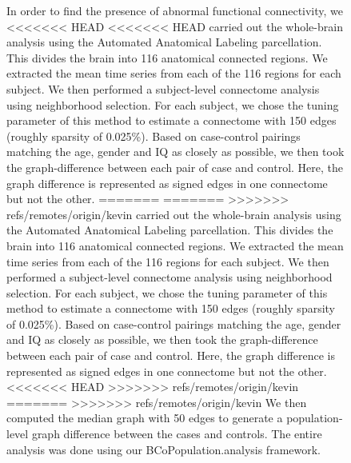 \documentclass{nature}
\begin{document}
{\begin{figure}[tb]
In order to find the presence of abnormal functional connectivity, we 
<<<<<<< HEAD
<<<<<<< HEAD
carried out the whole-brain analysis using the Automated Anatomical Labeling\cite{tzourio2002automated} parcellation. This divides the brain into
116 anatomical connected regions. We extracted the mean time series from each
of the 116 regions for each subject. We then performed a subject-level connectome
analysis using neighborhood selection\cite{meinshausen2006high}. For
each subject, we chose the tuning
parameter of this method to estimate a connectome with 150 edges (roughly sparsity
of 0.025\%). 
Based on case-control pairings matching the age, gender and IQ as closely as possible,
we then took the graph-difference between each pair of case and control. Here,
the graph difference is represented as signed edges in one connectome but not the other. 
=======
=======
>>>>>>> refs/remotes/origin/kevin
carried out the whole-brain analysis using the Automated Anatomical
Labeling\cite{tzourio2002automated} parcellation. This divides the brain into
116 anatomical connected regions. We extracted the mean time series from each
of the 116 regions for each subject. We then performed a subject-level
connectome
analysis using neighborhood selection\cite{meinshausen2006high}. For
each subject, we chose the tuning
parameter of this method to estimate a connectome with 150 edges (roughly
sparsity
of 0.025\%). 
Based on case-control pairings matching the age, gender and IQ as closely as
possible,
we then took the graph-difference between each pair of case and control. Here,
the graph difference is represented as signed edges in one connectome but not
the other. 
<<<<<<< HEAD
>>>>>>> refs/remotes/origin/kevin
=======
>>>>>>> refs/remotes/origin/kevin
We then computed the median graph\cite{han2013sparse} with 
50 edges 
to generate a population-level graph difference between the cases and controls.
The entire analysis was done using our BCoPopulation.analysis framework.


\end{figure}}
\end{document}
